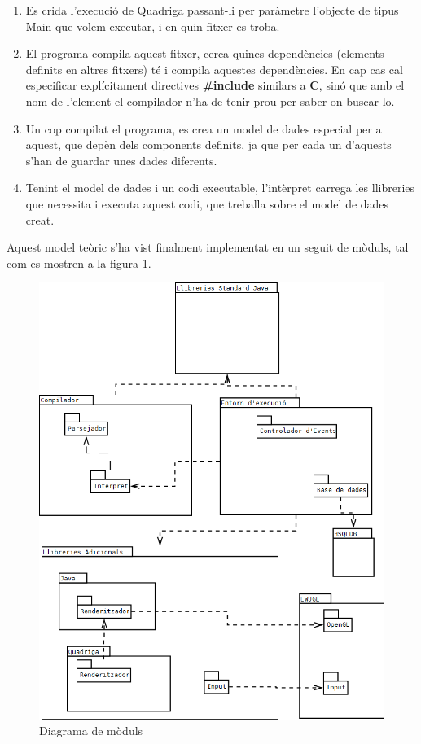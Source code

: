   \begin{enumerate}
    \item Es crida l'execució de Quadriga passant-li per paràmetre l'objecte de tipus Main que volem executar, i en quin fitxer es troba.
    \item El programa compila aquest fitxer, cerca quines dependències (elements definits en altres fitxers) té i compila aquestes dependències. En cap cas cal especificar explícitament directives {\bf \#{}include} similars a {\bf C}, sinó que amb el nom de l'element el compilador n'ha de tenir prou per saber on buscar-lo.
    \item Un cop compilat el programa, es crea un model de dades especial per a aquest, que depèn dels components definits, ja que per cada un d'aquests s'han de guardar unes dades diferents.
    \item Tenint el model de dades i un codi executable, l'intèrpret carrega les llibreries que necessita i executa aquest codi, que treballa sobre el model de dades creat.
  \end{enumerate}

  Aquest model teòric s'ha vist finalment implementat en un seguit de mòduls, tal com es mostren a la figura  \ref{fig:DiagramaDeModuls}.

  \begin{figure}
    \includegraphics[width=1\linewidth]{./img/Moduls.png}
    \caption{Diagrama de mòduls \label{fig:DiagramaDeModuls}}
  \end{figure}
  
